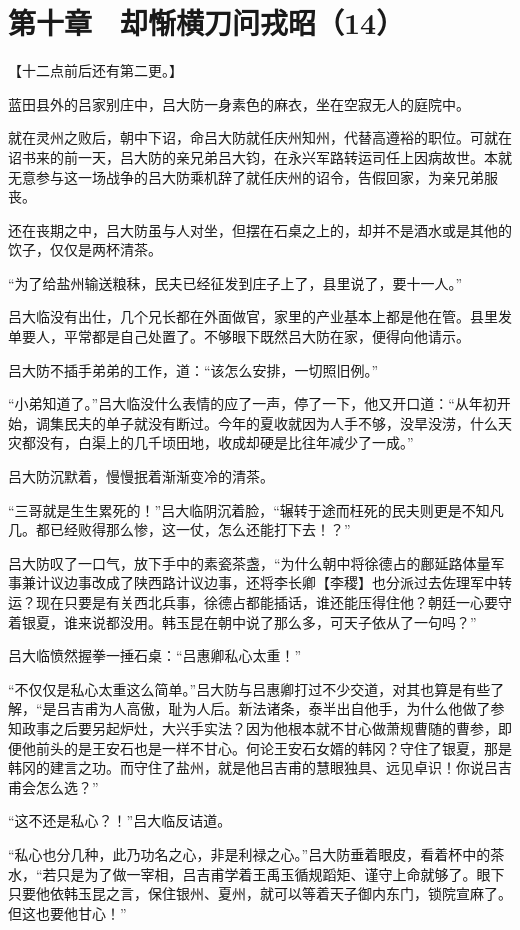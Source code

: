 \section{第十章　却惭横刀问戎昭（14）}

【十二点前后还有第二更。】

蓝田县外的吕家别庄中，吕大防一身素色的麻衣，坐在空寂无人的庭院中。

就在灵州之败后，朝中下诏，命吕大防就任庆州知州，代替高遵裕的职位。可就在诏书来的前一天，吕大防的亲兄弟吕大钧，在永兴军路转运司任上因病故世。本就无意参与这一场战争的吕大防乘机辞了就任庆州的诏令，告假回家，为亲兄弟服丧。

还在丧期之中，吕大防虽与人对坐，但摆在石桌之上的，却并不是酒水或是其他的饮子，仅仅是两杯清茶。

“为了给盐州输送粮秣，民夫已经征发到庄子上了，县里说了，要十一人。”

吕大临没有出仕，几个兄长都在外面做官，家里的产业基本上都是他在管。县里发单要人，平常都是自己处置了。不够眼下既然吕大防在家，便得向他请示。

吕大防不插手弟弟的工作，道：“该怎么安排，一切照旧例。”

“小弟知道了。”吕大临没什么表情的应了一声，停了一下，他又开口道：“从年初开始，调集民夫的单子就没有断过。今年的夏收就因为人手不够，没旱没涝，什么天灾都没有，白渠上的几千顷田地，收成却硬是比往年减少了一成。”

吕大防沉默着，慢慢抿着渐渐变冷的清茶。

“三哥就是生生累死的！”吕大临阴沉着脸，“辗转于途而枉死的民夫则更是不知凡几。都已经败得那么惨，这一仗，怎么还能打下去！？”

吕大防叹了一口气，放下手中的素瓷茶盏，“为什么朝中将徐德占的鄜延路体量军事兼计议边事改成了陕西路计议边事，还将李长卿【李稷】也分派过去佐理军中转运？现在只要是有关西北兵事，徐德占都能插话，谁还能压得住他？朝廷一心要守着银夏，谁来说都没用。韩玉昆在朝中说了那么多，可天子依从了一句吗？”

吕大临愤然握拳一捶石桌：“吕惠卿私心太重！”

“不仅仅是私心太重这么简单。”吕大防与吕惠卿打过不少交道，对其也算是有些了解，“是吕吉甫为人高傲，耻为人后。新法诸条，泰半出自他手，为什么他做了参知政事之后要另起炉灶，大兴手实法？因为他根本就不甘心做萧规曹随的曹参，即便他前头的是王安石也是一样不甘心。何论王安石女婿的韩冈？守住了银夏，那是韩冈的建言之功。而守住了盐州，就是他吕吉甫的慧眼独具、远见卓识！你说吕吉甫会怎么选？”

“这不还是私心？！”吕大临反诘道。

“私心也分几种，此乃功名之心，非是利禄之心。”吕大防垂着眼皮，看着杯中的茶水，“若只是为了做一宰相，吕吉甫学着王禹玉循规蹈矩、谨守上命就够了。眼下只要他依韩玉昆之言，保住银州、夏州，就可以等着天子御内东门，锁院宣麻了。但这也要他甘心！”

